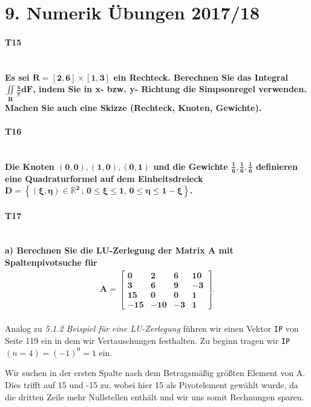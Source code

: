 \documentclass[10pt,a4paper]{article}
\begin{document}
	\section*{9. Numerik Übungen 2017/18}
	\paragraph{T15}\mbox{}\\
	\textbf{%
		Es sei $\mathbf{R = [2,6]\times[1,3]}$ ein Rechteck. Berechnen Sie das Integral $\mathbf{\iint\limits_R\frac{x}{y}dF}$, indem Sie in x- bzw. y- Richtung die Simpsonregel verwenden. Machen Sie auch eine Skizze (Rechteck, Knoten, Gewichte).
	}\\


	\paragraph{T16}\mbox{}\\
	\textbf{%
	Die Knoten $\mathbf{(0,0), (1,0), (0,1)}$ und die Gewichte $\mathbf{\frac{1}{6},\frac{1}{6},\frac{1}{6}}$ definieren eine Quadraturformel auf dem Einheitsdreieck $\mathbf{D=\left\lbrace (\xi,\eta) \in \mathbb{R}^2 \,;\, 0\leq\xi\leq 1,\, 0\leq\eta \leq1-\xi \right\rbrace}$.
	}
	\newpage
	\paragraph{T17}\mbox{}\\
	\textbf{%
		a) Berechnen Sie die LU-Zerlegung der Matrix A mit Spaltenpivotsuche für
		\begin{align*}\mathbf{
			A= \begin{bmatrix}
				0   & 2   & 6  & 10 \\
				3   & 6   & 9  & -3 \\
				15  & 0   & 0  & 1  \\
				-15 & -10 & -3 & 1
			\end{bmatrix}.}
		\end{align*}
	}\\
    Analog zu \emph{5.1.2 Beispiel für eine LU-Zerlegung} führen wir einen Vektor \texttt{IP} von Seite 119 ein in dem wir Vertauschungen festhalten. Zu beginn tragen wir \texttt{IP}$(n=4)=(-1)^0=1$ ein.
    
    Wir suchen in der ersten Spalte nach dem Betragsmäßig größten Element von A. Dies trifft auf 15 und -15 zu, wobei hier 15 als Pivotelement gewählt wurde, da die dritten Zeile mehr Nullstellen enthält und wir uns somit Rechnungen sparen.
    
\end{document}
